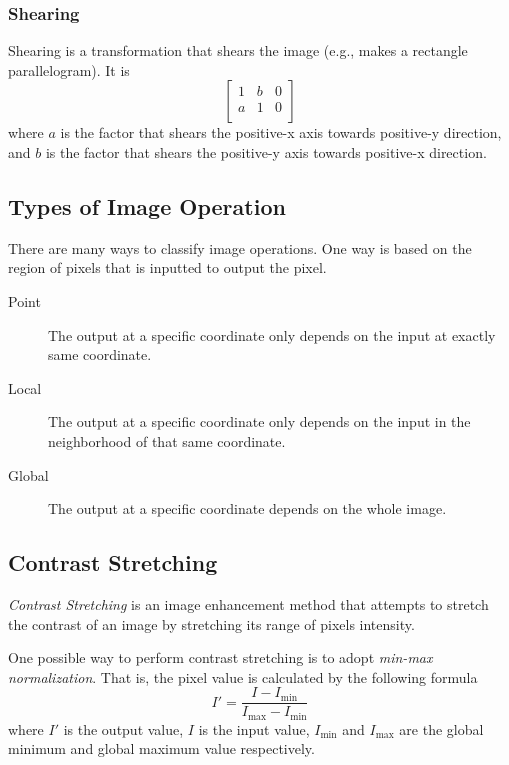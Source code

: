 \documentclass{note}
\begin{document}
\subsubsection{Shearing}

Shearing is a transformation that shears the image (e.g., makes a rectangle parallelogram). It is
\begin{equation*}
    \begin{bmatrix}
        1 & b & 0 \\
        a & 1 & 0 \\
    \end{bmatrix}
\end{equation*}
where $a$ is the factor that shears the positive-x axis towards positive-y direction, and $b$ is the factor that shears the positive-y axis towards positive-x direction.

\subsection{Types of Image Operation}

There are many ways to classify image operations. One way is based on the region of pixels that is inputted to output the pixel.
\begin{description}
    \item[Point] The output at a specific coordinate only depends on the input at exactly same coordinate.
    \item[Local] The output at a specific coordinate only depends on the input in the neighborhood of that same coordinate.
    \item[Global] The output at a specific coordinate depends on the whole image.
\end{description}

\subsection{Contrast Stretching}

\textit{Contrast Stretching} is an image enhancement method that attempts to stretch the contrast of an image by stretching its range of pixels intensity. 

One possible way to perform contrast stretching is to adopt \textit{min-max normalization}. That is, the pixel value is calculated by the following formula
\begin{equation*}
    I' = \frac{I - I_\mathrm{min}}{I_\mathrm{max} - I_\mathrm{min}}
\end{equation*}
where $I'$ is the output value, $I$ is the input value, $I_\mathrm{min}$ and $I_\mathrm{max}$ are the global minimum and global maximum value respectively.
\end{document}
